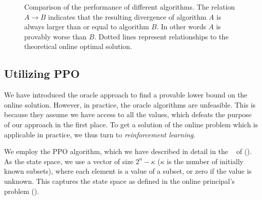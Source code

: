 \begin{figure*}[t!]
	\centering
	\caption{Comparison of the performance of different algorithms.
  The relation $ A \to B $ indicates that the resulting divergence of algorithm $ A $ is always larger than or equal to algorithm $ B $.
  In other words $ A $ is provably worse than $ B $.
  Dotted lines represent relationships to the theoretical online optimal solution.
}
\end{figure*}

\subsection{Utilizing PPO}
\label{sec:ppo}

We have introduced the oracle approach to find a provable lower bound on the online solution.
However, in practice, the oracle algorithms are unfeasible.
This is because they assume we have access to all the values, which defeats the purpose of our approach in the first place.
To get a solution of the online problem which is applicable in practice, we thus turn to \emph{reinforcement learning}.

We employ the PPO algorithm, which we have described in detail in the ~ of  ().
As the state space, we use a vector of size $ 2^n - \kappa $ ($ \kappa $ is the number of initially known subsets), where each element is a value of a subset, or zero if the value is unknown.
This captures the state space as defined in the online principal's problem ().

